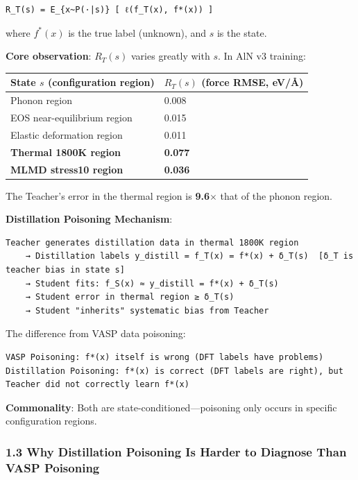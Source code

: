 \documentclass[
  12pt,
]{article}
\begin{document}
\begin{verbatim}
R_T(s) = E_{x~P(·|s)} [ ℓ(f_T(x), f*(x)) ]
\end{verbatim}

where $f^*(x)$ is the true label (unknown), and $s$ is the state.

\textbf{Core observation}: $R_T(s)$ varies greatly with $s$. In AlN v3 training:

\begin{longtable}[]{@{}ll@{}}
\toprule\noalign{}
State $s$ (configuration region) & $R_T(s)$ (force RMSE, eV/Å) \\
\midrule\noalign{}
\endhead
\bottomrule\noalign{}
\endlastfoot
Phonon region & 0.008 \\
EOS near-equilibrium region & 0.015 \\
Elastic deformation region & 0.011 \\
\textbf{Thermal 1800K region} & \textbf{0.077} \\
\textbf{MLMD stress10 region} & \textbf{0.036} \\
\end{longtable}

The Teacher's error in the thermal region is \textbf{9.6$\times$} that of the phonon region.

\textbf{Distillation Poisoning Mechanism}:

\begin{verbatim}
Teacher generates distillation data in thermal 1800K region
    → Distillation labels y_distill = f_T(x) = f*(x) + δ_T(s)  [δ_T is teacher bias in state s]
    → Student fits: f_S(x) ≈ y_distill = f*(x) + δ_T(s)
    → Student error in thermal region ≥ δ_T(s)
    → Student "inherits" systematic bias from Teacher
\end{verbatim}

The difference from VASP data poisoning:

\begin{verbatim}
VASP Poisoning: f*(x) itself is wrong (DFT labels have problems)
Distillation Poisoning: f*(x) is correct (DFT labels are right), but Teacher did not correctly learn f*(x)
\end{verbatim}

\textbf{Commonality}: Both are state-conditioned---poisoning only occurs in specific configuration regions.

\subsubsection{1.3 Why Distillation Poisoning Is Harder to Diagnose Than VASP Poisoning}\label{why-distillation-poisoning-is-harder-to-diagnose}
\end{document}
